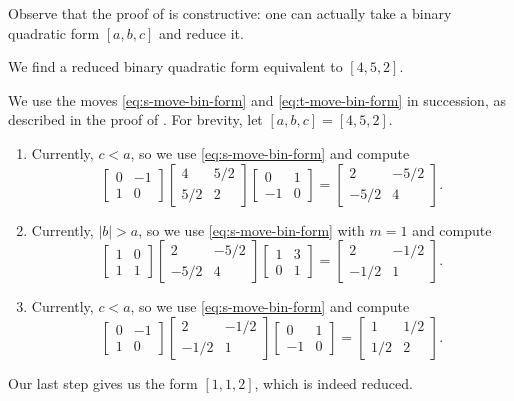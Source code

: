 \documentclass[../notes.tex]{subfiles}
\begin{document}
Observe that the proof of  is constructive: one can actually take a binary quadratic form $[a,b,c]$ and reduce it.
\begin{example}
	We find a reduced binary quadratic form equivalent to $[4,5,2]$.
\end{example}
\begin{solution}
	We use the moves \eqref{eq:s-move-bin-form} and \eqref{eq:t-move-bin-form} in succession, as described in the proof of . For brevity, let $[a,b,c]=[4,5,2]$.
	\begin{enumerate}
		\item Currently, $c<a$, so we use \eqref{eq:s-move-bin-form} and compute
		\[\begin{bmatrix}
			0 & -1 \\
			1 & 0
		\end{bmatrix}\begin{bmatrix}
			4 & 5/2 \\
			5/2 & 2
		\end{bmatrix}\begin{bmatrix}
			0 & 1 \\
			-1 & 0
		\end{bmatrix}=\begin{bmatrix}
			2 & -5/2 \\
			-5/2 & 4
		\end{bmatrix}.\]
		\item Currently, $\left|b\right|>a$, so we use \eqref{eq:s-move-bin-form} with $m=1$ and compute
		\[\begin{bmatrix}
			1 & 0 \\
			1 & 1
		\end{bmatrix}\begin{bmatrix}
			2 & -5/2 \\
			-5/2 & 4
		\end{bmatrix}\begin{bmatrix}
			1 & 3 \\
			0 & 1
		\end{bmatrix}=\begin{bmatrix}
			2 & -1/2 \\
			-1/2 & 1
		\end{bmatrix}.\]
		\item Currently, $c<a$, so we use \eqref{eq:s-move-bin-form} and compute
		\[\begin{bmatrix}
			0 & -1 \\
			1 & 0
		\end{bmatrix}\begin{bmatrix}
			2 & -1/2 \\
			-1/2 & 1
		\end{bmatrix}\begin{bmatrix}
			0 & 1 \\
			-1 & 0
		\end{bmatrix}=\begin{bmatrix}
			1 & 1/2 \\
			1/2 & 2
		\end{bmatrix}.\]
	\end{enumerate}
	Our last step gives us the form $[1,1,2]$, which is indeed reduced.
\end{solution}
\end{document}

